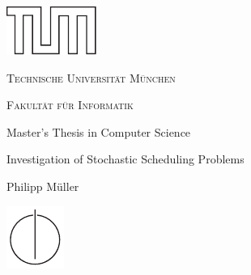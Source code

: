 
\setcounter{page}{0}

\begin{center}
  
  \thispagestyle{empty}

  \vspace{4cm}
  
  \includegraphics[scale=2]{formalities/tum_logo_outline}

  \vspace{1cm}
  
  \LARGE

  \textsc{Technische Universität München}

  \Large

  \textsc{Fakultät für Informatik}

  \vspace{2cm}

  \normalsize
  
  Master's Thesis in Computer Science

  \vspace{2cm}

  \Huge

  Investigation of Stochastic Scheduling Problems

  \vspace{1cm}

  \normalsize

  Philipp Müller

  \vfill

  \normalsize

  \includegraphics[scale=1.5]{formalities/tum_info_logo}

  \vspace{0.5cm}

\end{center}

